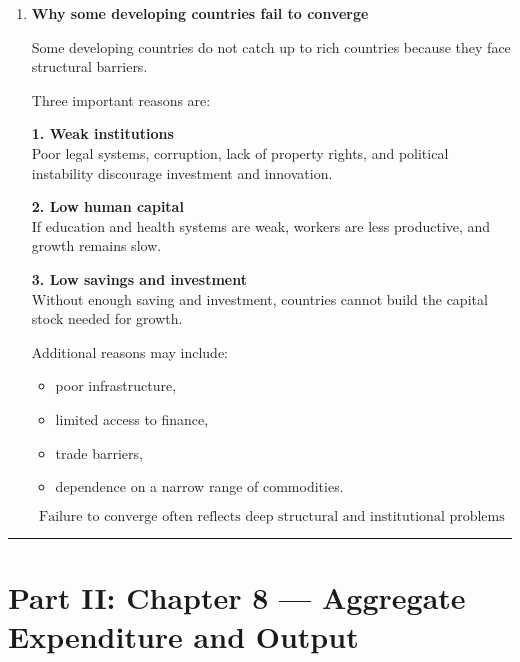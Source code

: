 \documentclass[12pt]{article}
\begin{document}
\begin{enumerate}[label=\textbf{\arabic*.}, start=6]

\item \textbf{Why some developing countries fail to converge}

Some developing countries do not catch up to rich countries because they face structural barriers.

Three important reasons are:

\textbf{1. Weak institutions}\\
Poor legal systems, corruption, lack of property rights, and political instability discourage investment and innovation.

\textbf{2. Low human capital}\\
If education and health systems are weak, workers are less productive, and growth remains slow.

\textbf{3. Low savings and investment}\\
Without enough saving and investment, countries cannot build the capital stock needed for growth.

Additional reasons may include:
\begin{itemize}
    \item poor infrastructure,
    \item limited access to finance,
    \item trade barriers,
    \item dependence on a narrow range of commodities.
\end{itemize}

\[
\boxed{\text{Failure to converge often reflects deep structural and institutional problems}}
\]

\end{enumerate}

\hrule
\vspace{1em}

\section*{Part II: Chapter 8 — Aggregate Expenditure and Output}
\end{document}
